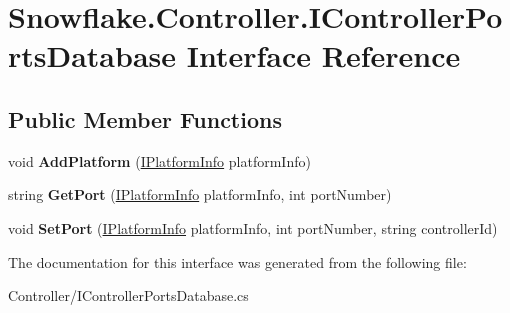 \hypertarget{interface_snowflake_1_1_controller_1_1_i_controller_ports_database}{}\section{Snowflake.\+Controller.\+I\+Controller\+Ports\+Database Interface Reference}
\label{interface_snowflake_1_1_controller_1_1_i_controller_ports_database}
\subsection*{Public Member Functions}
\begin{DoxyCompactItemize}
\item 
\hypertarget{interface_snowflake_1_1_controller_1_1_i_controller_ports_database_a9040495bc786b924c8d07796c8840635}{}void {\bfseries Add\+Platform} (\hyperlink{interface_snowflake_1_1_platform_1_1_i_platform_info}{I\+Platform\+Info} platform\+Info)\label{interface_snowflake_1_1_controller_1_1_i_controller_ports_database_a9040495bc786b924c8d07796c8840635}

\item 
\hypertarget{interface_snowflake_1_1_controller_1_1_i_controller_ports_database_a427afda45c69d4c7be339bad5df63710}{}string {\bfseries Get\+Port} (\hyperlink{interface_snowflake_1_1_platform_1_1_i_platform_info}{I\+Platform\+Info} platform\+Info, int port\+Number)\label{interface_snowflake_1_1_controller_1_1_i_controller_ports_database_a427afda45c69d4c7be339bad5df63710}

\item 
\hypertarget{interface_snowflake_1_1_controller_1_1_i_controller_ports_database_a9c833ac0647f76f59b048c27e1a29807}{}void {\bfseries Set\+Port} (\hyperlink{interface_snowflake_1_1_platform_1_1_i_platform_info}{I\+Platform\+Info} platform\+Info, int port\+Number, string controller\+Id)\label{interface_snowflake_1_1_controller_1_1_i_controller_ports_database_a9c833ac0647f76f59b048c27e1a29807}

\end{DoxyCompactItemize}


The documentation for this interface was generated from the following file\+:\begin{DoxyCompactItemize}
\item 
Controller/I\+Controller\+Ports\+Database.\+cs\end{DoxyCompactItemize}
